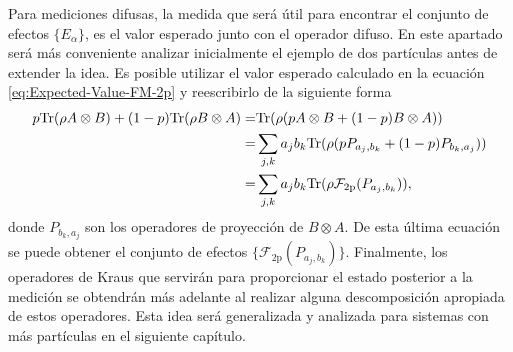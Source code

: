


Para mediciones difusas, la medida que será útil para encontrar el conjunto de
efectos $\{E_\alpha\}$, es el valor esperado junto con el operador difuso. En
este apartado será más conveniente analizar inicialmente el ejemplo de dos
partículas antes de extender la idea.  Es posible utilizar el valor esperado
calculado en la ecuación {\eqref{eq:Expected-Value-FM-2p}} y reescribirlo de la
siguiente forma
\begin{equation}\label{eq:ordenar-valoresperado-povm}
\begin{split}
    p{\rm Tr}(\rho A\otimes B)+ (1-p){\rm Tr}(\rho B\otimes A)
    =& {\rm Tr}(\rho (pA\otimes B+(1-p)B\otimes A))\\
    =&\sum_{j,k}{a_j b_k}{\rm Tr}(\rho (pP_{a_j,b_k}+(1-p)P_{b_k, a_j}))\\
    =&\sum_{j, k}{a_j b_k}{\rm Tr}(\rho \mathcal{F}_{2\text{p}}(P_{a_j,b_k})),\\
\end{split}
\end{equation} 
donde $P_{b_k,a_j}$ son los operadores de proyección de $B\otimes A$. De
esta última ecuación se puede obtener el conjunto de efectos
$\{\mathcal{F}_{2\text{p}}(P_{a_j,b_k})\}$. Finalmente, los operadores de Kraus
que servirán para proporcionar el estado posterior a la medición se obtendrán
más adelante al realizar alguna descomposición apropiada de estos operadores.
Esta idea será generalizada y analizada para sistemas con más partículas en el
siguiente capítulo. 

